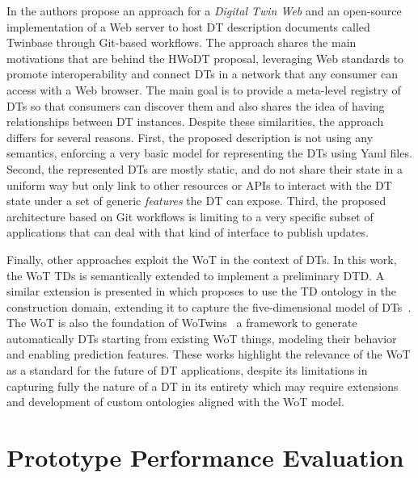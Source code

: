 In \cite{Autiosalo_Siegel_Tammi_2021} the authors propose an approach for a \emph{Digital Twin Web} and an open-source implementation of a Web server to host \ac{DT} description documents called Twinbase through Git-based workflows.
%
The approach shares the main motivations that are behind the \ac{HWoDT} proposal, leveraging Web standards to promote interoperability and connect \acp{DT} in a network that any consumer can access with a Web browser. The main goal is to provide a meta-level registry of \acp{DT} so that consumers can discover them and also shares the idea of having relationships between \ac{DT} instances.
%
Despite these similarities, the approach differs for several reasons. First, the proposed description is not using any semantics, enforcing a very basic model for representing the \acp{DT} using Yaml files. Second, the represented \acp{DT} are mostly static, and do not share their state in a uniform way but only link to other resources or \acp{API} to interact with the \ac{DT} state under a set of generic \emph{features} the \ac{DT} can expose. Third, the proposed architecture based on Git workflows is limiting to a very specific subset of applications that can deal with that kind of interface to publish updates.

Finally, other approaches exploit the \ac{WoT} in the context of \acp{DT}. In this work, the \ac{WoT} \acp{TD} is semantically extended to implement a preliminary \ac{DTD}. 
%
A similar extension is presented in \cite{González-Gerpe_Cimmino_Bernardos_Poveda-Villalón_García-Castro} which proposes to use the \ac{TD} ontology in the construction domain, extending it to capture the five-dimensional model of \acp{DT}~\cite{qi2021enablingtechdt}.
%
The \ac{WoT} is also the foundation of WoTwins~\cite{SciulloWoTwins2022} a framework to generate automatically \acp{DT} starting from existing \ac{WoT} things, modeling their behavior and enabling prediction features. 
%
These works highlight the relevance of the \ac{WoT} as a standard for the future of \ac{DT} applications, despite its limitations in capturing fully the nature of a \ac{DT} in its entirety which may require extensions and development of custom ontologies aligned with the \ac{WoT} model.

\section{Prototype Performance Evaluation}

